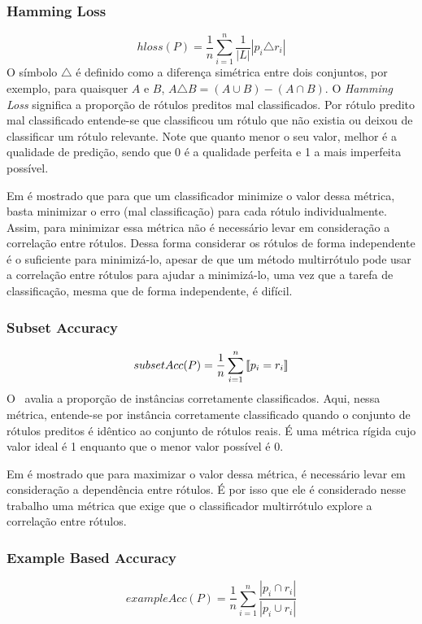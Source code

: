 \subsubsection{Hamming Loss}
\begin{equation}
 hloss(P)=\frac{1}{n} \sum_{i=1}^n{\frac{1}{|L|}|p_i \triangle r_i|}
\end{equation}
O símbolo $\triangle$ é definido como a diferença simétrica entre dois conjuntos, por exemplo, 
para quaisquer $A$ e $B$, $A \triangle B=(A \cup B) - (A \cap B)$.
O \textit{Hamming Loss} significa a proporção de rótulos preditos mal classificados. Por rótulo predito mal classificado
entende-se que classificou um rótulo que não existia ou deixou de classificar um rótulo relevante.
Note que quanto menor o seu valor, melhor é a qualidade de predição, sendo que 0 é a qualidade perfeita e 1 a mais
imperfeita possível.

Em \cite{pcc2010} é mostrado que para que um classificador minimize o valor dessa métrica, basta minimizar
o erro (mal classificação) para cada rótulo individualmente. 
Assim, para minimizar essa métrica não é necessário levar
em consideração a correlação entre rótulos. Dessa forma considerar os rótulos de forma independente é o suficiente para minimizá-lo,
apesar de que um método multirrótulo pode usar a correlação entre rótulos para ajudar a minimizá-lo, uma vez que 
a tarefa de classificação, mesma que de forma independente, é difícil.

\subsubsection{Subset Accuracy}
\begin{equation}
 subsetAcc(P)=\frac{1}{n} \sum_{i=1}^n{\text{\textlbrackdbl} p_i = r_i \text{\textrbrackdbl}}
\end{equation}
O \SA~avalia a proporção de instâncias corretamente classificados. Aqui, nessa métrica, 
entende-se por instância corretamente classificado quando o conjunto de rótulos preditos é
idêntico ao conjunto de rótulos reais. É uma métrica rígida cujo valor ideal é 1 enquanto
que o menor valor possível é 0.

Em \cite{pcc2010} é mostrado que para maximizar o valor dessa métrica, é necessário levar
em consideração a dependência entre rótulos. É por isso que ele é considerado nesse trabalho
uma métrica que exige que o classificador multirrótulo explore a correlação entre rótulos.


\subsubsection{Example Based Accuracy}
\begin{equation}
 exampleAcc(P)=\frac{1}{n} \sum_{i=1}^n{\frac{| p_i \cap r_i|}{| p_i \cup r_i|}}
\end{equation}

